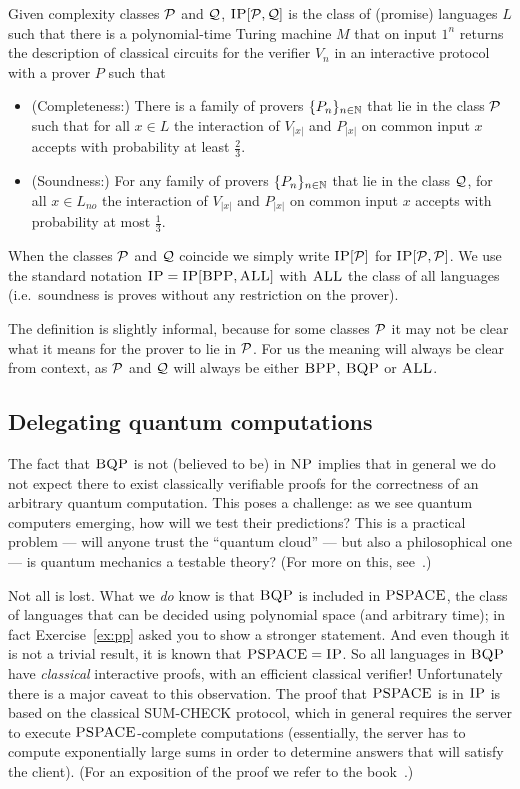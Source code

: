 \begin{definition}
Given complexity classes $\mathcal{P}$ and $\mathcal{Q}$, $\textsc{IP}[\mathcal{P},\mathcal{Q}]$ is the class of (promise) languages $L$ such that there is a polynomial-time Turing machine $M$ that on input $1^n$ returns the description of classical circuits for the verifier $V_n$ in an interactive protocol with a prover $P$ such that 
\begin{itemize}
\item (Completeness:) There is a family of provers $\{P_n\}_{n\in \mathbb{N}}$ that lie in the class $\mathcal{P}$ such that for all $x\in L$ the interaction of $V_{|x|}$ and $P_{|x|}$ on common input $x$ accepts with probability at least $\frac{2}{3}$.
\item (Soundness:) For any family of provers $\{P_n\}_{n\in \mathbb{N}}$ that lie in the class $\mathcal{Q}$, for all $x\in L_{no}$ the interaction of $V_{|x|}$ and $P_{|x|}$ on common input $x$ accepts with probability at most $\frac{1}{3}$.
\end{itemize}
When the classes $\mathcal{P}$ and $\mathcal{Q}$ coincide we simply write $\textsc{IP}[\mathcal{P}]$ for $\textsc{IP}[\mathcal{P},\mathcal{P}]$. We use the standard notation $\textsc{IP} = \textsc{IP}[ \textsc{BPP}, \textsc{ALL}]$ with $\textsc{ALL}$ the class of all languages (i.e.\ soundness is proves without any restriction on the prover). 
\end{definition}

The definition is slightly informal, because for some classes $\mathcal{P}$ it may not be clear what it means for the prover to lie in $\mathcal{P}$. For us the meaning will always be clear from context, as $\mathcal{P}$ and $\mathcal{Q}$ will always be either $\textsc{BPP}$, $\textsc{BQP}$ or $\textsc{ALL}$. 


\subsection{Delegating quantum computations}

The fact that $\textsc{BQP}$ is not (believed to be) in $\textsc{NP}$ implies that in general we do not expect there to exist classically verifiable proofs for the correctness of an arbitrary quantum computation. This poses a challenge: as we see quantum computers emerging, how will we test their predictions? This is a practical problem --- will anyone trust the ``quantum cloud'' --- but also a philosophical one --- is quantum mechanics a testable theory? (For more on this, see~\cite{aharonov2013quantum}.)

Not all is lost. What we \emph{do} know is that $\textsc{BQP}$ is included in $\textsc{PSPACE}$, the class of languages that can be decided using polynomial space (and arbitrary time); in fact Exercise~\ref{ex:pp} asked you to show a stronger statement. And even though it is not a trivial result, it is known that $\textsc{PSPACE} = \textsc{IP}$. 
So all languages in $\textsc{BQP}$ have \emph{classical} interactive proofs, with an efficient classical verifier! Unfortunately there is a major caveat to this observation. The proof that $\textsc{PSPACE}$ is in $\textsc{IP}$ is based on the classical SUM-CHECK protocol, which in general requires the server to execute $\textsc{PSPACE}$-complete computations (essentially, the server has to compute exponentially large sums in order to determine answers that will satisfy the client). (For an exposition of the proof we refer to the book~\cite{arora2009computational}.)


